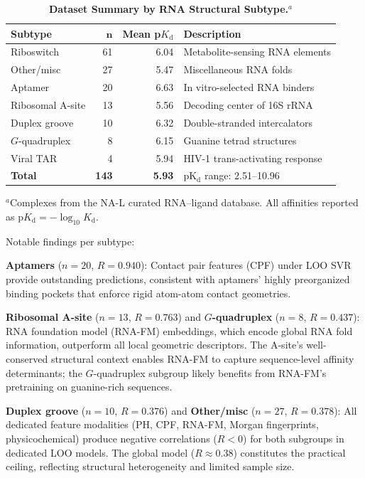 \documentclass[10pt,twocolumn]{article}
\begin{document}
\begin{table}[htbp]
\centering
\caption{\textbf{Dataset Summary by RNA Structural Subtype.}$^{a}$}
\label{tab:dataset}
\small
\begin{tabular}{lrrl}
\toprule
\textbf{Subtype} & $\bm{n}$ & \textbf{Mean p$K_\mathrm{d}$} & \textbf{Description} \\
\midrule
Riboswitch       & 61 & 6.04 & Metabolite-sensing RNA elements \\
Other/misc       & 27 & 5.47 & Miscellaneous RNA folds \\
Aptamer          & 20 & 6.63 & In vitro-selected RNA binders \\
Ribosomal A-site & 13 & 5.56 & Decoding center of 16S rRNA \\
Duplex groove    & 10 & 6.32 & Double-stranded intercalators \\
$G$-quadruplex   &  8 & 6.15 & Guanine tetrad structures \\
Viral TAR        &  4 & 5.94 & HIV-1 trans-activating response \\
\midrule
\textbf{Total}   & \textbf{143} & \textbf{5.93} & pK$_\mathrm{d}$ range: 2.51--10.96 \\
\bottomrule
\end{tabular}
\small{$^{a}$Complexes from the NA-L curated RNA--ligand database.
All affinities reported as p$K_\mathrm{d} = -\log_{10}K_\mathrm{d}$.}
\end{table}

Notable findings per subtype:

\textbf{Aptamers} ($n = 20$, $R = 0.940$): Contact pair features (CPF)
under LOO SVR provide outstanding predictions, consistent with aptamers'
highly preorganized binding pockets that enforce rigid atom-atom contact
geometries.

\textbf{Ribosomal A-site} ($n = 13$, $R = 0.763$) and
\textbf{$G$-quadruplex} ($n = 8$, $R = 0.437$): RNA foundation model
(RNA-FM) embeddings, which encode global RNA fold information, outperform
all local geometric descriptors.
The A-site's well-conserved structural context enables RNA-FM to capture
sequence-level affinity determinants; the $G$-quadruplex subgroup likely
benefits from RNA-FM's pretraining on guanine-rich sequences.

\textbf{Duplex groove} ($n = 10$, $R = 0.376$) and
\textbf{Other/misc} ($n = 27$, $R = 0.378$): All dedicated feature
modalities (PH, CPF, RNA-FM, Morgan fingerprints, physicochemical) produce
negative correlations ($R < 0$) for both subgroups in dedicated LOO models.
The global model ($R \approx 0.38$) constitutes the practical ceiling,
reflecting structural heterogeneity and limited sample size.
\end{document}
